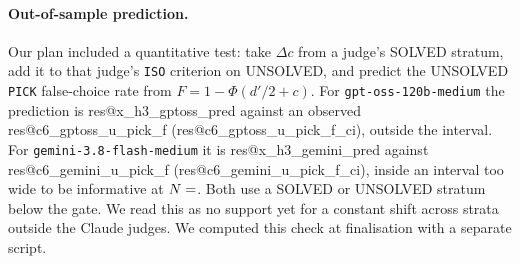 \documentclass[10pt,twocolumn]{article}
\makeatletter
\newcommand{\res}[1]{\csname res@#1\endcsname}
\makeatother
\begin{document}
\paragraph{Out-of-sample prediction.} Our plan included a quantitative test: take $\Delta c$ from a judge's SOLVED stratum, add it to that judge's \texttt{ISO} criterion on UNSOLVED, and predict the UNSOLVED \texttt{PICK} false-choice rate from $F = 1 - \Phi(d'/2 + c)$. For \texttt{gpt-oss-120b-medium} the prediction is \res{x_h3_gptoss_pred} against an observed \res{c6_gptoss_u_pick_f} (\res{c6_gptoss_u_pick_f_ci}), outside the interval. For \texttt{gemini-3.8-flash-medium} it is \res{x_h3_gemini_pred} against \res{c6_gemini_u_pick_f} (\res{c6_gemini_u_pick_f_ci}), inside an interval too wide to be informative at $N=\res{c6_gemini_u_pi_n}$. Both use a SOLVED or UNSOLVED stratum below the gate. We read this as no support yet for a constant shift across strata outside the Claude judges. We computed this check at finalisation with a separate script.
\end{document}
